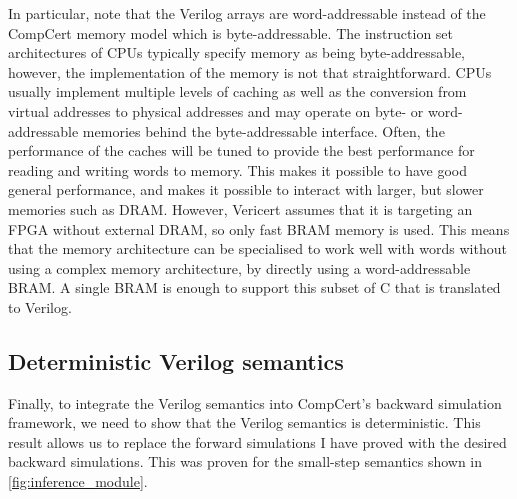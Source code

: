 In particular, note that the Verilog arrays are word-addressable instead of the
CompCert memory model which is byte-addressable.  The instruction set
architectures of \glspl{CPU} typically specify memory as being byte-addressable,
however, the implementation of the memory is not that straightforward.
\Glspl{CPU} usually implement multiple levels of caching as well as the
conversion from virtual addresses to physical addresses and may operate on byte-
or word-addressable memories behind the byte-addressable interface.  Often, the
performance of the caches will be tuned to provide the best performance for
reading and writing words to memory.  This makes it possible to have good
general performance, and makes it possible to interact with larger, but slower
memories such as \gls{DRAM}.  However, Vericert assumes that it is targeting an
\gls{FPGA} without external \gls{DRAM}, so only fast \gls{BRAM} memory is used.
This means that the memory architecture can be specialised to work well with
words without using a complex memory architecture, by directly using a
word-addressable \gls{BRAM}.  A single \gls{BRAM} is enough to support this
subset of C that is translated to Verilog.


\subsection{Deterministic Verilog semantics}%
\label{sec:proof:deterministic}

Finally, to integrate the Verilog semantics into CompCert's backward simulation
framework, we need to show that the Verilog semantics is deterministic. This
result allows us to replace the forward simulations I have proved with the
desired backward simulations.  This was proven for the small-step semantics
shown in \cref{fig:inference_module}.

